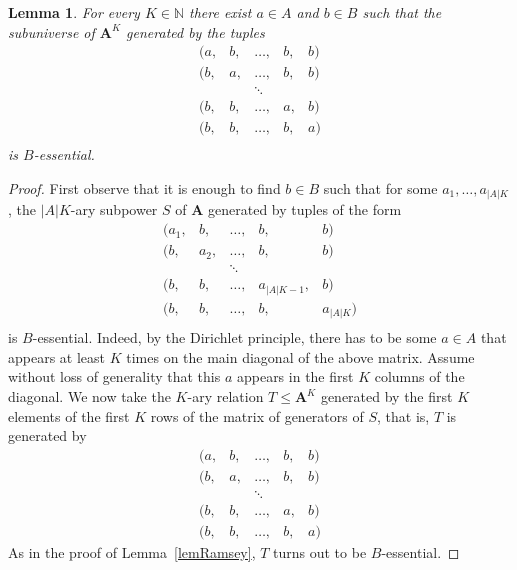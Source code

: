 \documentclass{amsart}
\theoremstyle{plain}
\newtheorem{lemma}[theorem]{Lemma}
\theoremstyle{definition}
\begin{document}
\begin{lemma}\label{lemSymmetric}
  For every 
  $K\in{{\mathbb N}}$ there exist $a\in A$ and $b\in B$ such that the
  subuniverse of ${{\mathbf{A}}}^K$  generated by the tuples
  \[
  \begin{matrix}
    (a,&b,&\dots,&b,&b)\\
    (b,&a,&\dots,&b,&b)\\
       &&\ddots\\
    (b,&b,&\dots,&a,&b)\\
    (b,&b,&\dots,&b, &a)\\
\end{matrix}
\]
is $B$-essential.
\end{lemma}
\begin{proof}
   First observe that it is enough to find $b\in B$ such that for
  some $a_1,\dots, a_{|A|K}$, the $|A|K$-ary subpower
  $S$ of ${{\mathbf{A}}}$ generated by tuples of the form
  \[
  \begin{matrix}
    (a_1,&b,&\dots,&b,&b)\\
    (b,&a_2,&\dots,&b,&b)\\
       &&\ddots\\
    (b,&b,&\dots,&a_{|A|K-1},&b)\\
    (b,&b,&\dots,&b, &a_{|A|K})\\
\end{matrix}
\]
is $B$-essential. Indeed, by the Dirichlet principle, 
there has to be some $a\in A$ that appears at least
  $K$ times on the main diagonal of the above matrix. Assume without loss of
  generality that this $a$ appears in the first $K$ columns of the
  diagonal. We now take the $K$-ary relation $T \leq {{\mathbf{A}}}^K$ generated by the first $K$ elements of
  the first $K$ rows of the matrix of generators of $S$, that is, $T$ is generated by
  \[
  \begin{matrix}
    (a,&b,&\dots,&b,&b)\\
    (b,&a,&\dots,&b,&b)\\
       &&\ddots\\
    (b,&b,&\dots,&a,&b)\\
    (b,&b,&\dots,&b, &a)
\end{matrix}
\]
  As in the proof of Lemma~\ref{lemRamsey}, $T$ turns out to be $B$-essential.


\end{proof}
\end{document}
